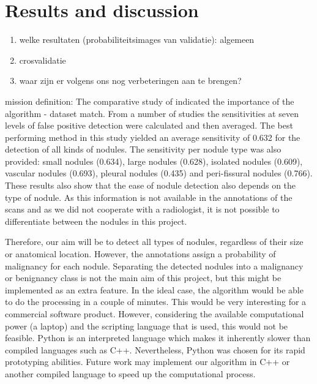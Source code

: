 \section{Results and discussion}

\begin{enumerate}
\item welke resultaten (probabiliteitsimages van validatie): algemeen
\item crosvalidatie
\item waar zijn er volgens ons nog verbeteringen aan te brengen?
\end{enumerate}



mission definition:
The comparative study of \cite{ginneken} indicated the importance of the
algorithm - dataset match. From a number of studies the sensitivities at seven
levels of false positive detection were calculated and then averaged. The best
performing method in this study yielded an average sensitivity of 0.632 for the
detection of all kinds of nodules. The sensitivity per nodule type was also
provided: small nodules (0.634), large nodules (0.628), isolated nodules
(0.609), vascular nodules (0.693), pleural nodules (0.435) and peri-fissural
nodules (0.766).
These results also show that the ease of nodule detection also depends on the
type of nodule. As this information is not available in the annotations of the
scans and as we did not cooperate with a radiologist, it is not possible to
differentiate between the nodules in this project.

Therefore, our aim will be to
detect all types of nodules, regardless of their size or anatomical location.
However, the annotations assign a probability of malignancy for each nodule.
Separating the detected nodules into a malignancy or benignancy class is not the
main aim of this project, but this might be implemented as an extra feature.
In the ideal case, the algorithm would be able to do the processing in a couple
of minutes. This would be very interesting for a commercial software product.
However, considering the available computational power (a laptop) and the
scripting language that is used, this would not be feasible. Python is an
interpreted language which makes it inherently slower than compiled languages
such as C++. Nevertheless, Python was chosen for its rapid prototyping
abilities. Future work may implement our algorithm in C++ or another compiled
language to speed up the computational process.
